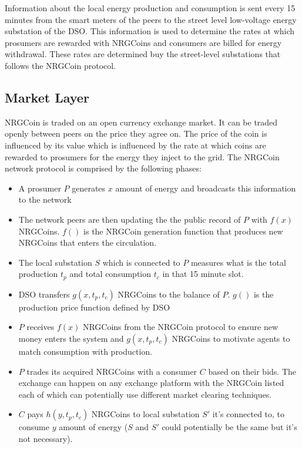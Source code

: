Information about the local energy production and consumption is sent every 15 minutes from the smart meters of the peers to the
street level low-voltage energy substation of the DSO. This information is used to determine the rates at which prosumers are rewarded with NRGCoins and
consumers are billed for energy withdrawal. These rates are determined buy the street-level substations that follows the NRGCoin protocol.
\cite{NRGCoin}


\subsection{Market Layer}

NRGCoin is traded on an open currency exchange market. It can be traded openly between peers on the price they agree on. The price of the coin is influenced by
its value which is influenced by the rate at which coins are rewarded to prosumers for the energy they inject to the grid.
The NRGCoin network protocol is comprised by the following phases:
\begin{itemize}
    \item A prosumer $P$ generates $x$ amount of energy and broadcasts this information to the network
    \item The network peers are then updating the the public record of $P$ with $f(x)$ NRGCoins. $f()$ is the NRGCoin generation function that produces new
          NRGCoins that enters the circulation.
    \item The local substation $S$ which is connected to $P$ measures what is the total production $t_p$ and total consumption $t_c$ in
          that 15 minute slot.
    \item DSO transfers $g(x,t_p,t_c)$ NRGCoins to the balance of $P$. $g()$ is the production price function defined by DSO
    \item $P$ receives $f(x)$ NRGCoins from the NRGCoin protocol to ensure new money enters the system and $g(x,t_p,t_c)$ NRGCoins to motivate agents to match
          consumption with production.
    \item $P$ trades its acquired NRGCoins with a consumer $C$ based on their bids. The exchange can happen on any exchange platform with the NRGCoin listed
          each of which can potentially use different market clearing techniques.
    \item $C$ pays $h(y,t_p,t_c)$ NRGCoins to local substation $S'$ it's connected to, to consume $y$ amount of energy ($S$ and $S'$ could potentially be the same but it's not necessary).
\end{itemize}

